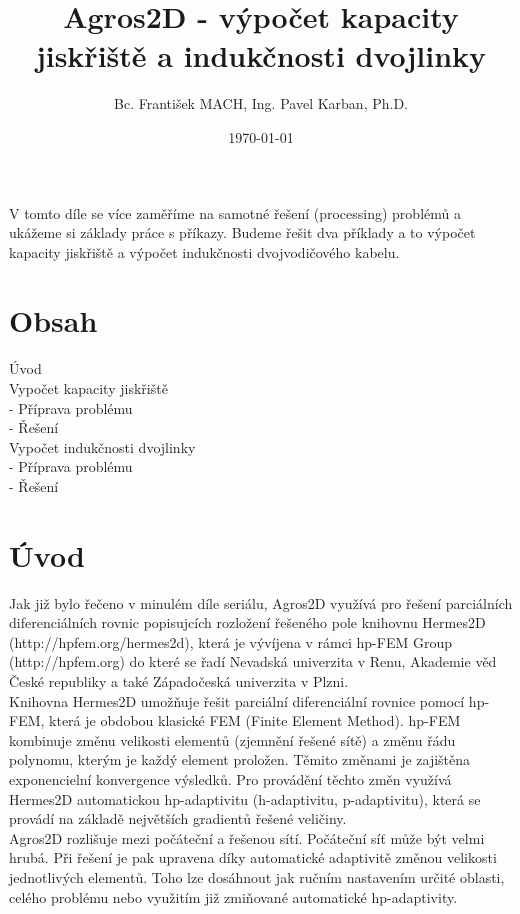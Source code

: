 \documentclass[a4paper, oneside]{article}
\begin{document}
\author{Bc. František MACH, Ing. Pavel Karban, Ph.D.}
\date{\today}
\title{Agros2D - výpočet kapacity jiskřiště a indukčnosti dvojlinky}
\maketitle
V tomto díle se více zaměříme na samotné řešení (processing) problémů a ukážeme si základy práce s příkazy. Budeme řešit dva příklady a to výpočet kapacity jiskřiště a výpočet indukčnosti dvojvodičového kabelu.
\section{Obsah}
Úvod\\
Vypočet kapacity jiskřiště\\
 - Příprava problému\\
 - Řešení\\
Vypočet indukčnosti dvojlinky\\
 - Příprava problému\\
 - Řešení\\
 \section{Úvod}
Jak již bylo řečeno v minulém díle seriálu, Agros2D využívá pro řešení parciálních diferenciálních rovnic popisujcích rozložení řešeného pole knihovnu Hermes2D (http://hpfem.org/hermes2d), která je vývíjena v rámci hp-FEM Group (http://hpfem.org) do které se řadí Nevadská univerzita v Renu, Akademie věd České republiky a také Západočeská univerzita v Plzni.\\
Knihovna Hermes2D umožňuje řešit parciální diferenciální rovnice pomocí hp-FEM, která je obdobou klasické FEM (Finite Element Method). hp-FEM kombinuje změnu velikosti elementů (zjemnění řešené sítě) a změnu řádu polynomu, kterým je každý element proložen. Těmito změnami je zajištěna exponencielní konvergence výsledků. Pro provádění těchto změn využívá Hermes2D automatickou hp-adaptivitu (h-adaptivitu, p-adaptivitu), která se provádí na základě největších gradientů řešené veličiny.\\
Agros2D rozlišuje mezi počáteční a řešenou sítí. Počáteční síť může být velmi hrubá. Při řešení je pak upravena díky automatické adaptivitě změnou velikosti jednotlivých elementů. Toho lze dosáhnout jak ručním nastavením určité oblasti, celého problému nebo využitím již zmiňované automatické hp-adaptivity.\\
\end{document}
